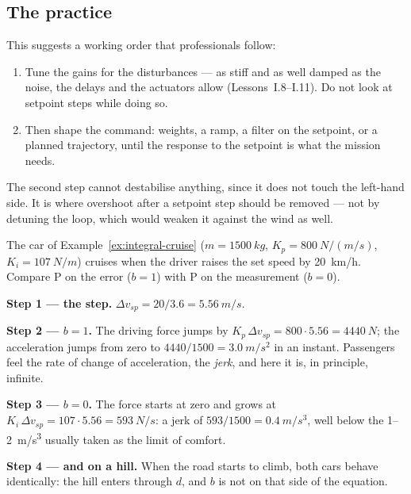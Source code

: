 \subsection{The practice}
This suggests a working order that professionals follow:
\begin{enumerate}
  \item Tune the gains for the disturbances — as stiff and as well damped as the noise, the delays and the actuators allow (Lessons~I.8–I.11). Do not look at setpoint steps while doing so.
  \item Then shape the command: weights, a ramp, a filter on the setpoint, or a planned trajectory, until the response to the setpoint is what the mission needs.
\end{enumerate}
The second step cannot destabilise anything, since it does not touch the left-hand side. It is where overshoot after a setpoint step should be removed — not by detuning the loop, which would weaken it against the wind as well.

\begin{example}
\label{ex:kick-cruise}
The car of Example~\ref{ex:integral-cruise} ($m = \SI{1500}{kg}$, $K_p = \SI{800}{N/(m/s)}$, $K_i = \SI{107}{N/m}$) cruises when the driver raises the set speed by \SI{20}{km/h}. Compare P on the error ($b = 1$) with P on the measurement ($b = 0$).

\textbf{Step 1 — the step.} $\Delta v_{sp} = 20/3.6 = \SI{5.56}{m/s}$.

\textbf{Step 2 — $b = 1$.} The driving force jumps by $K_p\,\Delta v_{sp} = 800 \cdot 5.56 = \SI{4440}{N}$; the acceleration jumps from zero to $4440/1500 = \SI{3.0}{m/s^2}$ in an instant. Passengers feel the rate of change of acceleration, the \emph{jerk}, and here it is, in principle, infinite.

\textbf{Step 3 — $b = 0$.} The force starts at zero and grows at $K_i\,\Delta v_{sp} = 107 \cdot 5.56 = \SI{593}{N/s}$: a jerk of $593/1500 = \SI{0.4}{m/s^3}$, well below the \SI{1}{}–\SI{2}{m/s^3} usually taken as the limit of comfort.

\textbf{Step 4 — and on a hill.} When the road starts to climb, both cars behave identically: the hill enters through $d$, and $b$ is not on that side of the equation.
\end{example}

